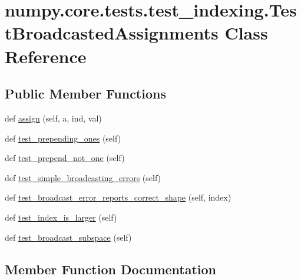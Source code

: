 \hypertarget{classnumpy_1_1core_1_1tests_1_1test__indexing_1_1TestBroadcastedAssignments}{}\section{numpy.\+core.\+tests.\+test\+\_\+indexing.\+Test\+Broadcasted\+Assignments Class Reference}
\label{classnumpy_1_1core_1_1tests_1_1test__indexing_1_1TestBroadcastedAssignments}
\subsection*{Public Member Functions}
\begin{DoxyCompactItemize}
\item 
def \hyperlink{classnumpy_1_1core_1_1tests_1_1test__indexing_1_1TestBroadcastedAssignments_ae96ecbd5b692eab7c5cc1601acfb62de}{assign} (self, a, ind, val)
\item 
def \hyperlink{classnumpy_1_1core_1_1tests_1_1test__indexing_1_1TestBroadcastedAssignments_a4e44dd56ab5eee09e3ba366056449245}{test\+\_\+prepending\+\_\+ones} (self)
\item 
def \hyperlink{classnumpy_1_1core_1_1tests_1_1test__indexing_1_1TestBroadcastedAssignments_a6340b4977d91a5d8144ae08a2da3556e}{test\+\_\+prepend\+\_\+not\+\_\+one} (self)
\item 
def \hyperlink{classnumpy_1_1core_1_1tests_1_1test__indexing_1_1TestBroadcastedAssignments_a301e68a68d27d29889df6648e9e78d5c}{test\+\_\+simple\+\_\+broadcasting\+\_\+errors} (self)
\item 
def \hyperlink{classnumpy_1_1core_1_1tests_1_1test__indexing_1_1TestBroadcastedAssignments_a9654b00065f84979cea7739be8513d0e}{test\+\_\+broadcast\+\_\+error\+\_\+reports\+\_\+correct\+\_\+shape} (self, index)
\item 
def \hyperlink{classnumpy_1_1core_1_1tests_1_1test__indexing_1_1TestBroadcastedAssignments_a59be491e46c24bf54ada0ccacf7801ed}{test\+\_\+index\+\_\+is\+\_\+larger} (self)
\item 
def \hyperlink{classnumpy_1_1core_1_1tests_1_1test__indexing_1_1TestBroadcastedAssignments_a723678f7b14e128132bef974d9cde9f0}{test\+\_\+broadcast\+\_\+subspace} (self)
\end{DoxyCompactItemize}


\subsection{Member Function Documentation}
\mbox{\label{classnumpy_1_1core_1_1tests_1_1test__indexing_1_1TestBroadcastedAssignments_ae96ecbd5b692eab7c5cc1601acfb62de}} 
